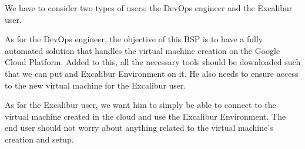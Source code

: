 We have to consider two types of users: the DevOps engineer and the
Excalibur user.

As for the DevOps engineer, the objective of this BSP is to have a
fully automated solution that handles the virtual machine creation on
the Google Cloud Platform.  Added to this, all the necessary tools
should be downloaded such that we can put and Excalibur Environment on
it. He also needs to ensure access to the new virtual machine for the
Excalibur user.

As for the Excalibur user, we want him to simply be able to connect to
the virtual machine created in the cloud and use the Excalibur
Environment. The end user should not worry about anything related to
the virtual machine's creation and setup.

